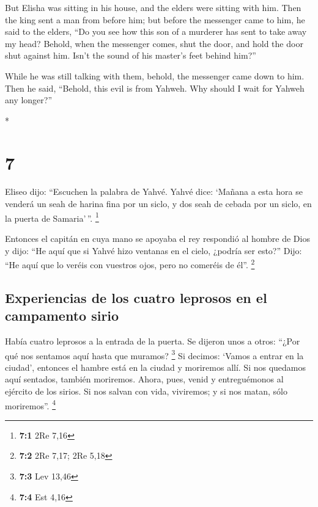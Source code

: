 \begin{paracol}{2}
\begin{otherlanguage}{english}
 But Elisha was sitting in his house, and the elders were
sitting with him. Then the king sent a man from before him; but before
the messenger came to him, he said to the elders, ``Do you see how this
son of a murderer has sent to take away my head? Behold, when the
messenger comes, shut the door, and hold the door shut against him.
Isn't the sound of his master's feet behind him?''

 While he was still talking with them, behold, the
messenger came down to him. Then he said, ``Behold, this evil is from
Yahweh. Why should I wait for Yahweh any longer?''

\end{otherlanguage}

\switchcolumn[0]*

\hypertarget{section-12}{%
\section{7}\label{section-12}}

 Eliseo dijo: ``Escuchen la palabra de Yahvé. Yahvé dice:
`Mañana a esta hora se venderá un seah de harina fina por un siclo, y
dos seah de cebada por un siclo, en la puerta de Samaria'\,''.
\footnote{\textbf{7:1} 2Re 7,16}

 Entonces el capitán en cuya mano se apoyaba el rey
respondió al hombre de Dios y dijo: ``He aquí que si Yahvé hizo ventanas
en el cielo, ¿podría ser esto?'' Dijo: ``He aquí que lo veréis con
vuestros ojos, pero no comeréis de él''. \footnote{\textbf{7:2} 2Re
  7,17; 2Re 5,18}

\hypertarget{experiencias-de-los-cuatro-leprosos-en-el-campamento-sirio}{%
\subsection{Experiencias de los cuatro leprosos en el campamento
sirio}\label{experiencias-de-los-cuatro-leprosos-en-el-campamento-sirio}}

 Había cuatro leprosos a la entrada de la puerta. Se
dijeron unos a otros: ``¿Por qué nos sentamos aquí hasta que muramos?
\footnote{\textbf{7:3} Lev 13,46}  Si decimos: `Vamos a
entrar en la ciudad', entonces el hambre está en la ciudad y moriremos
allí. Si nos quedamos aquí sentados, también moriremos. Ahora, pues,
venid y entreguémonos al ejército de los sirios. Si nos salvan con vida,
viviremos; y si nos matan, sólo moriremos''. \footnote{\textbf{7:4} Est
  4,16}


\end{paracol}
